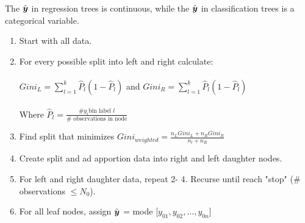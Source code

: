 \documentclass[12pt]{article}
\begin{document}
\begin{enumerate}


The $\hat{\boldsymbol{y}}$ in regression trees is continuous, while the $\hat{\boldsymbol{y}}$ in classification trees is a categorical variable. 


\begin{enumerate}[1.]
\item Start with all data.
\item For every possible split into left and right calculate: \\ \\
$Gini_L = \sum_{l=1}^{k} \hat{P}_l (1 - \hat{P}_l )$ and $Gini_R = \sum_{l=1}^{k} \hat{P}_l (1 - \hat{P}_l )$ \\ \\
Where $\hat{P}_l = \frac{\# y_i \text{bin label $l$}}{\# \text{ observations in node}}$
\item Find split that minimizes $Gini_{weighted} = \frac{n_L Gini_L + n_R Gini_R}{n_l + n_R}$
\item Create split and ad apportion data into right and left daughter nodes. 
\item For left and right daughter data, repeat 2- 4. Recurse until reach "stop" (\# observations $\leq N_0$). 
\item For all leaf nodes, assign $\hat{\boldsymbol{y}}$ = mode [$y_{01}, y_{02}, \dots , y_{0n}$]
\end{enumerate}



\end{enumerate}

\end{document}
